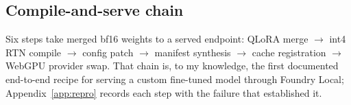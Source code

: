 \subsection{Compile-and-serve chain}\label{sec:imp-compile}
Six steps take merged bf16 weights to a served endpoint: QLoRA merge
$\to$ int4 RTN compile $\to$ config patch $\to$ manifest synthesis $\to$
cache registration $\to$ WebGPU provider swap. That chain is, to my
knowledge, the first documented end-to-end recipe for serving a custom
fine-tuned model through Foundry Local;
Appendix~\ref{app:repro} records each step with the failure that
established it.
